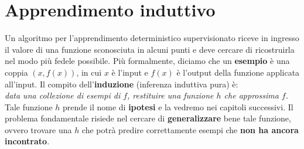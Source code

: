 \section{Apprendimento induttivo}
Un algoritmo per l'apprendimento deterministico supervisionato riceve in ingresso il valore di una funzione sconosciuta in alcuni punti e deve cercare di ricostruirla nel modo più fedele possibile. Più formalmente, diciamo che un \textbf{esempio} è una coppia $(x, f(x))$, in cui $x$ è l'input e $f(x)$ è l'output della funzione applicata all'input. Il compito dell'\textbf{induzione} (inferenza induttiva pura) è:\\
\textit{data una collezione di esempi di $f$, restituire una funzione $h$ che approssima $f$.}\\
Tale funzione $h$ prende il nome di \textbf{ipotesi} e la vedremo nei capitoli successivi. Il problema fondamentale risiede nel cercare di \textbf{generalizzare} bene tale funzione, ovvero trovare una $h$ che potrà predire correttamente esempi che \textbf{non ha ancora incontrato}. 
\newpage
